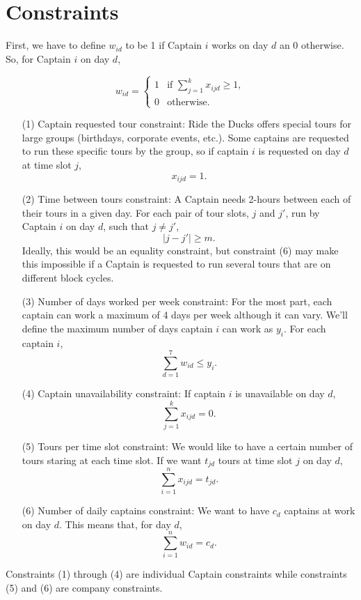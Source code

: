 \documentclass[12pt]{article}
\begin{document}
\section*{Constraints}
First, we have to define 
$w_{id}$ to be 1 if Captain $i$ works on day $d$ an 0 otherwise. So, for Captain $i$ on day $d$, 

$$w_{id} = \begin{cases} 1 & \mbox{if } \sum_{j = 1}^{k}x_{ijd} \ge 1,\\
0 & \mbox{otherwise}. \end{cases}$$

\begin{enumerate}
\item[(1)] Captain requested tour constraint: Ride the Ducks offers special tours for large groups (birthdays, corporate events,  etc.). Some captains are requested to run these specific tours by the group, so if captain $i$ is requested on
day $d$ at time slot $j$,
$$x_{ijd} = 1.$$
\item[(2)] Time between tours constraint: A Captain needs 2-hours between each of their tours in a given day. 
For each pair of tour slots, $j$ and $j'$, run by Captain $i$ on day $d$, such that $j \neq j'$,
$$\lvert j - j'\rvert \ge m.$$
Ideally, this would be an equality constraint, but constraint (6) may make this impossible if a Captain is requested to run several tours that are on different block cycles. 
\item[(3)] Number of days worked per week constraint: For the most part, each captain can work a maximum of 4 days per week although it can vary. We'll define the maximum number of days captain $i$ can work as $y_i$.
For each captain $i$,
$$\sum_{d = 1}^{7}w_{id}\le y_i.$$
\item[(4)] Captain unavailability constraint: If captain $i$ is unavailable on day $d$,
$$\sum_{j = 1}^{k}{x_{ijd}} = 0.$$
\item[(5)] Tours per time slot constraint: We would like to have a certain number of tours staring at each time slot. If we want $t_{jd}$ tours at time slot $j$ on day $d$,
$$\sum_{i = 1}^{n}{x_{ijd}} = t_{jd}.$$
\item[(6)] Number of daily captains constraint: We want to have $c_d$ captains at work on day $d$. This means that, for day $d$, 
$$\sum_{i = 1}^{n}{w_{id}} = c_d.$$
\end{enumerate}
Constraints (1) through (4) are individual Captain constraints while constraints (5) and (6) are company constraints. 
\end{document}
